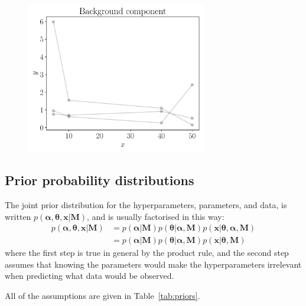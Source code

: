 \documentclass[a4paper, 12pt]{article}
\newcommand{\hypers}{\boldsymbol{\alpha}}
\newcommand{\params}{\boldsymbol{\theta}}
\newcommand{\data}{\boldsymbol{x}}
\newcommand{\info}{\boldsymbol{M}}
\begin{document}
\begin{figure}
\centering
\includegraphics[width=0.7\textwidth]{figures/background.pdf}
\caption{\label{fig:background}}
\end{figure}



\subsection{Prior probability distributions}

The joint prior distribution for the hyperparameters, parameters, and data,
is written $p(\hypers, \params, \data | \info)$, and is usually factorised
in this way:
\begin{align}
p(\hypers, \params, \data | \info) &=
    p(\hypers | \info)p(\params | \hypers, \info)
    p(\data | \params, \hypers, \info)\\
    &= p(\hypers | \info)p(\params | \hypers, \info)
    p(\data | \params, \info)
\end{align}
where the first step is true in general by the product rule, and the second
step assumes that knowing the parameters would make the hyperparameters
irrelevant when predicting what data would be observed.

All of the assumptions are given in Table~\ref{tab:priors}.
\end{document}
